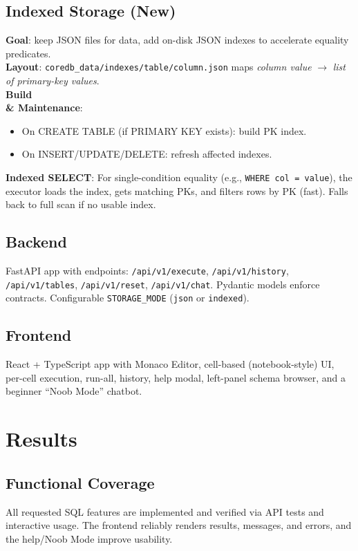 \documentclass[12pt,a4paper]{article}
\begin{document}
\subsection{Indexed Storage (New)}
\textbf{Goal}: keep JSON files for data, add on-disk JSON indexes to accelerate equality predicates.\\
\textbf{Layout}: \texttt{coredb\_data/indexes/{table}/{column}.json} maps \emph{column value} $\to$ \emph{list of primary-key values}.\\
\textbf{Build \\& Maintenance}:\
\begin{itemize}[leftmargin=*,nosep]
  \item On CREATE TABLE (if PRIMARY KEY exists): build PK index.
  \item On INSERT/UPDATE/DELETE: refresh affected indexes.
\end{itemize}
\textbf{Indexed SELECT}: For single-condition equality (e.g., \texttt{WHERE col = value}), the executor loads the index, gets matching PKs, and filters rows by PK (fast). Falls back to full scan if no usable index.

\subsection{Backend}
FastAPI app with endpoints: \texttt{/api/v1/execute}, \texttt{/api/v1/history}, \texttt{/api/v1/tables}, \texttt{/api/v1/reset}, \texttt{/api/v1/chat}. Pydantic models enforce contracts. Configurable \texttt{STORAGE\_MODE} (\texttt{json} or \texttt{indexed}).

\subsection{Frontend}
React + TypeScript app with Monaco Editor, cell-based (notebook-style) UI, per-cell execution, run-all, history, help modal, left-panel schema browser, and a beginner ``Noob Mode'' chatbot.

\section{Results}
\subsection{Functional Coverage}
All requested SQL features are implemented and verified via API tests and interactive usage. The frontend reliably renders results, messages, and errors, and the help/Noob Mode improve usability.
\end{document}
